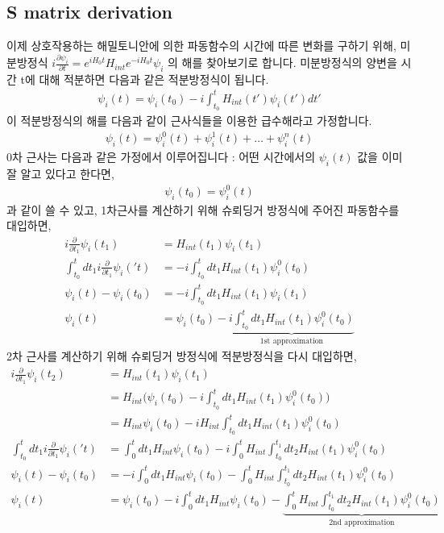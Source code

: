 \documentclass{article}
\begin{document}
 \subsection*{S matrix derivation}
 이제 상호작용하는 해밀토니안에 의한 파동함수의 시간에 따른 변화를 구하기 위해, 미분방정식 $i\frac{\partial{\psi_i}}{\partial{t}} = e^{iH_0t}H_{int}e^{-iH_0t}\psi_i$ 의 해를 찾아보기로 합니다.
 미분방정식의 양변을 시간 t에 대해 적분하면 다음과 같은 적분방정식이 됩니다.
 \begin{align}
   \psi_i(t)=\psi_i(t_0)-i\int^t_{t_0}H_{int}(t')\psi_i(t')dt'
 \end{align}
 이 적분방정식의 해를 다음과 같이 근사식들을 이용한 급수해라고 가정합니다.
 \begin{align}
    \psi_i(t) = \psi^0_i(t) + \psi^1_i(t) + \dots + \psi^n_i(t)
 \end{align}
 0차 근사는 다음과 같은 가정에서 이루어집니다 : 어떤 시간에서의 $\psi_i(t)$ 값을 이미 잘 알고 있다고 한다면,
 \begin{align}
    \psi_i(t_0) = \psi^0_i(t)
 \end{align}
 과 같이 쓸 수 있고, 1차근사를 계산하기 위해 슈뢰딩거 방정식에 주어진 파동함수를 대입하면,
 \begin{align}
    i\frac{\partial}{\partial{t_1}}\psi_i(t_1) &= H_{int}(t_1)\psi_i(t_1)\\
    \int^{t}_{t_0} dt_1 i\frac{\partial}{\partial{t_1}}\psi_i('t) &= -i\int^{t}_{t_0} dt_1H_{int}(t_1)\psi^0_i(t_0) \\
    \psi_i(t)-\psi_i(t_0) &= -i\int^{t}_{t_0} dt_1H_{int}(t_1)\psi_i(t_1) \\
    \psi_i(t) 
    &=\psi_i(t_0) - \underbrace{i\int^{t}_{t_0} dt_1H_{int}(t_1)\psi^0_i(t_0)}_\text{1st approximation}
 \end{align}
 2차 근사를 계산하기 위해 슈뢰딩거 방정식에 적분방정식을 다시 대입하면,
 \begin{align}
   i\frac{\partial}{\partial{t_1}}\psi_i(t_2) &= H_{int}(t_1)\psi_i(t_1)\\
      &=H_{int}\bigg(\psi_i(t_0) -i \int^{t}_{t_0} dt_1H_{int}(t_1)\psi^0_i(t_0)\bigg)\\
      &=H_{int}\psi_i(t_0) -i H_{int}\int^{t}_{t_0} dt_1 H_{int}(t_1)\psi^0_i(t_0)\\
   \int^{t}_{t_0} dt_1 i\frac{\partial}{\partial{t_1}}\psi_i('t) 
      &= \int^t_0 dt_1 H_{int}\psi_i(t_0) -i \int^t_0H_{int}\int^{t_1}_{t_0} dt_2 H_{int}(t_1)\psi^0_i(t_0) \\
   \psi_i(t)-\psi_i(t_0) 
      &= -i\int^t_0 dt_1 H_{int}\psi_i(t_0) - \int^t_0H_{int}\int^{t_1}_{t_0} dt_2 H_{int}(t_1)\psi^0_i(t_0) \\
   \psi_i(t) &= \psi_i(t_0) -i \int^t_0 dt_1 H_{int}\psi_i(t_0) - \underbrace{\int^t_0H_{int}\int^{t_1}_{t_0} dt_2 H_{int}(t_1)\psi^0_i(t_0)}_\text{2nd approximation}
\end{align}
\end{document}
